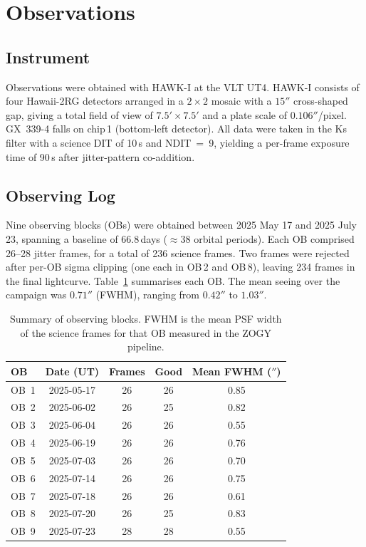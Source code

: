 \documentclass[12pt,a4paper]{article}
\begin{document}
\section{Observations}
\label{sec:obs}

\subsection{Instrument}

Observations were obtained with HAWK-I at the VLT UT4.  HAWK-I
consists of four Hawaii-2RG detectors arranged in a $2 \times 2$
mosaic with a $15''$ cross-shaped gap, giving a total field of view
of $7.5' \times 7.5'$ and a plate scale of $0.106''$/pixel.
GX~339-4 falls on chip\,1 (bottom-left detector).  All data were
taken in the Ks filter with a science DIT of 10\,s and NDIT~=~9,
yielding a per-frame exposure time of 90\,s after jitter-pattern
co-addition.

\subsection{Observing Log}

Nine observing blocks (OBs) were obtained between 2025 May 17 and
2025 July 23, spanning a baseline of 66.8\,days ($\approx 38$ orbital
periods).  Each OB comprised 26--28 jitter frames, for a total of
236 science frames.  Two frames were rejected after per-OB sigma
clipping (one each in OB\,2 and OB\,8), leaving 234 frames in the
final lightcurve.  Table~\ref{tab:obs} summarises each OB.  The
mean seeing over the campaign was $0.71''$ (FWHM), ranging from
$0.42''$ to $1.03''$.

\begin{table}[h]
  \centering
  \caption{Summary of observing blocks.  FWHM is the mean PSF width
           of the science frames for that OB measured in the ZOGY
           pipeline.}
  \label{tab:obs}
  \begin{tabular}{lcccc}
    \toprule
    OB & Date (UT) & Frames & Good & Mean FWHM ($''$) \\
    \midrule
    OB~1 & 2025-05-17 & 26 & 26 & 0.85 \\
    OB~2 & 2025-06-02 & 26 & 25 & 0.82 \\
    OB~3 & 2025-06-04 & 26 & 26 & 0.55 \\
    OB~4 & 2025-06-19 & 26 & 26 & 0.76 \\
    OB~5 & 2025-07-03 & 26 & 26 & 0.70 \\
    OB~6 & 2025-07-14 & 26 & 26 & 0.75 \\
    OB~7 & 2025-07-18 & 26 & 26 & 0.61 \\
    OB~8 & 2025-07-20 & 26 & 25 & 0.83 \\
    OB~9 & 2025-07-23 & 28 & 28 & 0.55 \\
    \bottomrule
  \end{tabular}
\end{table}
\end{document}
